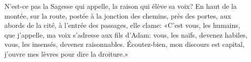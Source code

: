 N’est-ce pas la Sagesse qui appelle,
	la raison qui élève sa voix?
En haut de la montée, sur la route, postée à la jonction des chemins,
	près des portes, aux abords de la cité, à l’entrée des passages,
	elle clame: «C’est vous, les humains, que j’appelle,
	ma voix s’adresse aux fils d’Adam:
	vous, les naïfs, devenez habiles, vous, les insensés, devenez raisonnables.
Écoutez-bien, mon discours est capital,
	j’ouvre mes lèvres pour dire la droiture.»
